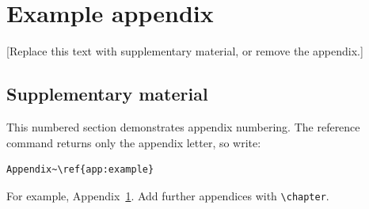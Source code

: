 \chapter{Example appendix}
\label{app:example}
[Replace this text with supplementary material, or remove the appendix.]

\section{Supplementary material}
This numbered section demonstrates appendix numbering.
The reference command returns only the appendix letter, so write:

\begin{verbatim}
Appendix~\ref{app:example}
\end{verbatim}

For example, Appendix~\ref{app:example}. Add further appendices with \verb|\chapter|.
